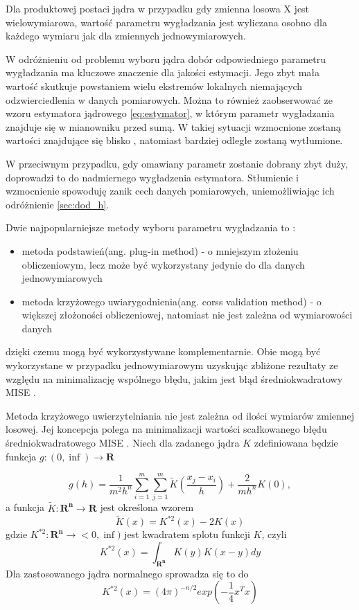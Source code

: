 Dla produktowej postaci jądra w przypadku gdy zmienna losowa X jest wielowymiarowa, wartość parametru wygładzania jest wyliczana osobno dla każdego wymiaru jak dla zmiennych jednowymiarowych. 

W odróżnieniu od problemu wyboru jądra dobór odpowiedniego parametru wygładzania ma kluczowe znaczenie dla jakości estymacji. Jego zbyt mała wartość skutkuje powstaniem wielu ekstremów lokalnych niemających odzwierciedlenia w danych pomiarowych. Można to również zaobserwować ze wzoru estymatora jądrowego \eqref{eq:estymator}, w którym parametr wygładzania znajduje się w mianowniku przed sumą. W takiej sytuacji wzmocnione zostaną wartości znajdujące się blisko , natomiast bardziej odległe zostaną wytłumione.

W przeciwnym przypadku, gdy omawiany parametr zostanie dobrany zbyt duży, doprowadzi to do nadmiernego wygładzenia estymatora. Stłumienie  i wzmocnienie  spowoduję zanik cech danych pomiarowych, uniemożliwiając ich odróżnienie \ref{sec:dod_h}.

Dwie najpopularniejsze metody wyboru parametru wygładzania to : \cite{Kul10} 
\begin{itemize}
\item metoda podstawień(ang. plug-in method) - o mniejszym złożeniu obliczeniowym, lecz może być wykorzystany jedynie do dla danych jednowymiarowych
\item metoda krzyżowego uwiarygodnienia(ang. corss validation method) - o większej złożoności obliczeniowej, natomiast nie jest zależna od wymiarowości danych
\end{itemize}
dzięki czemu mogą być wykorzystywane komplementarnie. Obie mogą być wykorzystane w przypadku jednowymiarowym uzyskując zbliżone rezultaty ze względu na minimalizację wspólnego błędu, jakim jest błąd średniokwadratowy MISE \cite{Kul05}.

Metoda krzyżowego uwierzytelniania nie jest zależna od ilości wymiarów zmiennej losowej. Jej koncepcja polega na minimalizacji wartości scałkowanego błędu średniokwadratowego MISE \cite{Kul05} \cite{Kul10}. Niech dla zadanego jądra $K$ zdefiniowana będzie funkcja $g:(0,\inf ) \rightarrow \mathbf{R}$

\begin{equation}
g(h)=\frac{1}{m^2h^n}\displaystyle\sum_{i=1}^{m} \displaystyle\sum_{j=1}^{m} \widetilde{K}(\frac{x_j - x_i}{h}) + \frac{2}{mh^n}K(0),
\end{equation}
a funkcja $\widetilde{K}: \mathbf{R^n} \rightarrow \mathbf{R}$ jest określona wzorem
\begin{equation}
\widetilde{K}(x) = K^{*2}(x) - 2K(x)
\end{equation}
gdzie $K^{*2}: \mathbf{R^n} \rightarrow <0, \inf )$ jest kwadratem splotu funkcji $K$, czyli
\begin{equation}
K^{*2}(x) = \int_{\mathbf{R^n}}K(y)K(x-y)dy
\end{equation}
Dla zastosowanego jądra normalnego sprowadza się to do 
\begin{equation}
K^{*2}(x) = (4\pi)^{-n/2} exp(-\frac{1}{4}x^Tx)
\end{equation}

